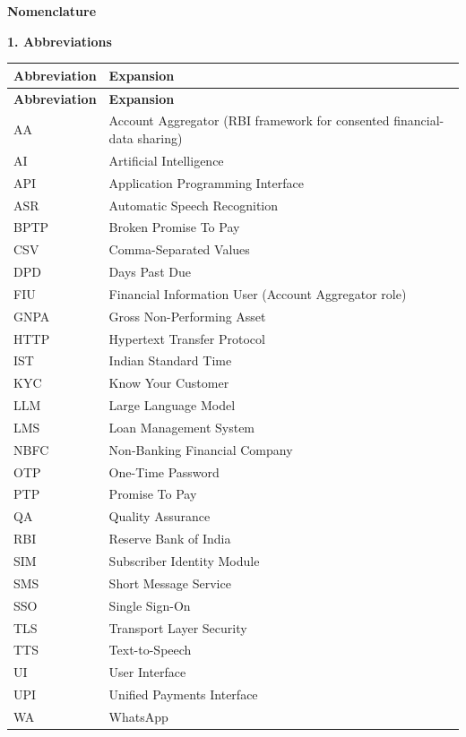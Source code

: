 \thispagestyle{plain}
\begin{center}
{\Large \bf Nomenclature}
\end{center}
\vspace{0.4cm}

\noindent\textbf{\large 1. Abbreviations}
\vspace{0.2cm}

\noindent
\begin{longtable}{@{}p{} p{}@{}}
\toprule
\textbf{Abbreviation} & \textbf{Expansion} \\
\midrule
\endfirsthead
\toprule
\textbf{Abbreviation} & \textbf{Expansion} \\
\midrule
\endhead
\bottomrule
\endfoot
AA & Account Aggregator (RBI framework for consented financial-data sharing) \\
AI & Artificial Intelligence \\
API & Application Programming Interface \\
ASR & Automatic Speech Recognition \\
BPTP & Broken Promise To Pay \\
CSV & Comma-Separated Values \\
DPD & Days Past Due \\
FIU & Financial Information User (Account Aggregator role) \\
GNPA & Gross Non-Performing Asset \\
HTTP & Hypertext Transfer Protocol \\
IST & Indian Standard Time \\
KYC & Know Your Customer \\
LLM & Large Language Model \\
LMS & Loan Management System \\
NBFC & Non-Banking Financial Company \\
OTP & One-Time Password \\
PTP & Promise To Pay \\
QA & Quality Assurance \\
RBI & Reserve Bank of India \\
SIM & Subscriber Identity Module \\
SMS & Short Message Service \\
SSO & Single Sign-On \\
TLS & Transport Layer Security \\
TTS & Text-to-Speech \\
UI & User Interface \\
UPI & Unified Payments Interface \\
WA & WhatsApp \\
\end{longtable}

